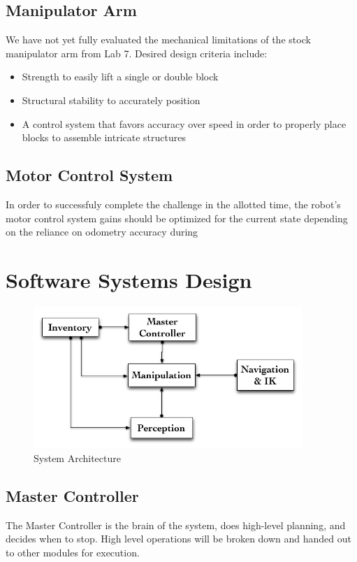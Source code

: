 \documentclass[letterpaper,11pt]{article}
\begin{document}
\subsection{Manipulator Arm}
We have not yet fully evaluated the mechanical limitations of the stock manipulator arm from Lab 7. Desired design criteria include:
\begin{itemize}
\item Strength to easily lift a single or double block
\item Structural stability to accurately position
\item A control system that favors accuracy over speed in order to properly place blocks to assemble intricate structures
\end{itemize}
\subsection {Motor Control System}
In order to successfuly complete the challenge in the allotted time, the robot's motor control system gains should be optimized for the current state depending on the reliance on  odometry accuracy during
\section{Software Systems Design}
\begin{figure}[h]
\centering
 \includegraphics[width=4in]{images/System_Architecture}
\caption{System Architecture}
\end{figure}

\subsection{Master Controller}
The Master Controller is the brain of the system, does high-level planning, and decides when to stop.
High level operations will be broken down and handed out to other modules for execution.
\end{document}
